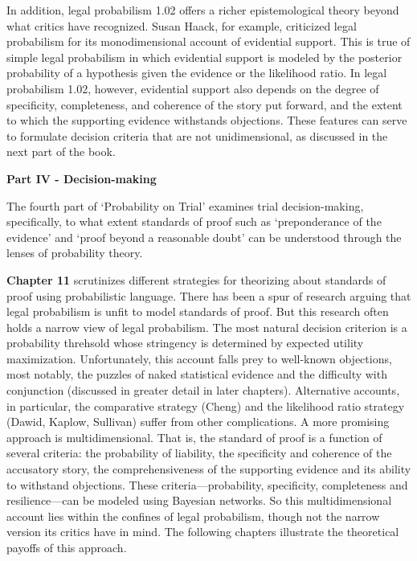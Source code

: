\documentclass[
  10pt,
  dvipsnames,enabledeprecatedfontcommands]{scrartcl}
\begin{document}
In addition, legal probabilism 1.02 offers a richer epistemological
theory beyond what critics have recognized. Susan Haack, for example,
criticized legal probabilism for its monodimensional account of
evidential support. This is true of simple legal probabilism in which
evidential support is modeled by the posterior probability of a
hypothesis given the evidence or the likelihood ratio. In legal
probabilism 1.02, however, evidential support also depends on the degree
of specificity, completeness, and coherence of the story put forward,
and the extent to which the supporting evidence withstands objections.
These features can serve to formulate decision criteria that are not
unidimensional, as discussed in the next part of the book.

\vspace{3mm}

\noindent \textbf{Part IV - Decision-making}

\noindent The fourth part of `Probability on Trial' examines trial
decision-making, specifically, to what extent standards of proof such as
`preponderance of the evidence' and `proof beyond a reasonable doubt'
can be understood through the lenses of probability theory.

\textbf{Chapter 11} scrutinizes different strategies for theorizing
about standards of proof using probabilistic language. There has been a
spur of research arguing that legal probabilism is unfit to model
standards of proof. But this research often holds a narrow view of legal
probabilism. The most natural decision criterion is a probability
threhsold whose stringency is determined by expected utility
maximization. Unfortunately, this account falls prey to well-known
objections, most notably, the puzzles of naked statistical evidence and
the difficulty with conjunction (discussed in greater detail in later
chapters). Alternative accounts, in particular, the comparative strategy
(Cheng) and the likelihood ratio strategy (Dawid, Kaplow, Sullivan)
suffer from other complications. A more promising approach is
multidimensional. That is, the standard of proof is a function of
several criteria: the probability of liability, the specificity and
coherence of the accusatory story, the comprehensiveness of the
supporting evidence and its ability to withstand objections. These
criteria---probability, specificity, completeness and resilience---can
be modeled using Bayesian networks. So this multidimensional account
lies within the confines of legal probabilism, though not the narrow
version its critics have in mind. The following chapters illustrate the
theoretical payoffs of this approach.
\end{document}
